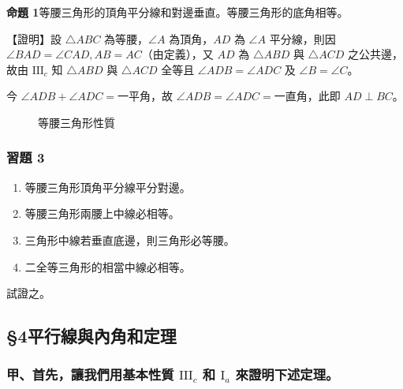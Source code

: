 \noindent\textbf{命題 1}\quad 等腰三角形的頂角平分線和對邊垂直。等腰三角形的底角相等。

\noindent【證明】\quad 設 $\triangle ABC$ 為等腰，$\angle A$ 為頂角，$AD$ 為 $\angle A$ 平分線，則因 $\angle BAD = \angle CAD, AB = AC$（由定義），又 $AD$ 為 $\triangle ABD$ 與 $\triangle ACD$ 之公共邊，故由 $\mathrm{III}_c$ 知 $\triangle ABD$ 與 $\triangle ACD$ 全等且 $\angle ADB = \angle ADC$ 及 $\angle B = \angle C$。

今 $\angle ADB + \angle ADC = \text{一平角}$，故 $\angle ADB = \angle ADC = \text{一直角}$，此即 $AD \perp BC$。

\begin{figure}[H]
\centering
{}
\caption{等腰三角形性質}
\label{fig:b3s-a1-17}
\end{figure}

\subsubsection*{習題 3}
\begin{enumerate}[1., leftmargin=2em]
  \item 等腰三角形頂角平分線平分對邊。
  \item 等腰三角形兩腰上中線必相等。
  \item 三角形中線若垂直底邊，則三角形必等腰。
  \item 二全等三角形的相當中線必相等。
\end{enumerate}
試證之。

\subsection*{\S 4\quad 平行線與內角和定理}
\label{sec:b3s_a1_4}

\subsubsection*{甲、首先，讓我們用基本性質 $\mathrm{III}_c$ 和 $\mathrm{I}_a$ 來證明下述定理。}

